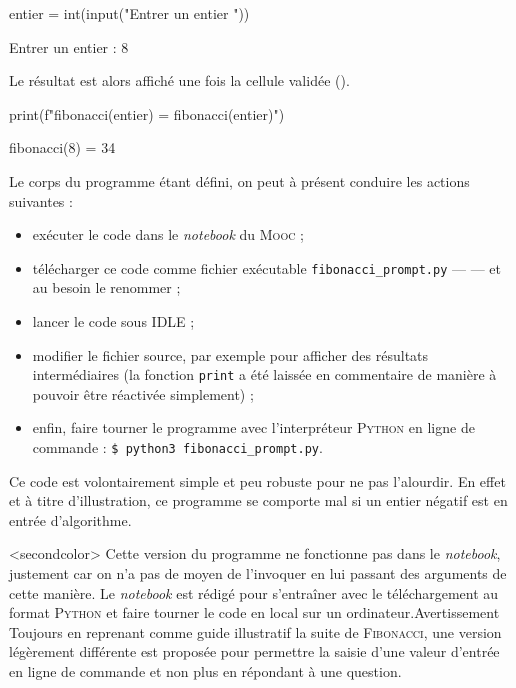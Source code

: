 \begin{nbjupyterin}[before skip=6pt, after skip=4pt]{2}
entier = int(input("Entrer un entier "))
\end{nbjupyterin}
\begin{nbjupyterout}[before skip=2pt, after skip=2pt]{2}
Entrer un entier : 8
\end{nbjupyterout}

Le résultat est alors affiché une fois la cellule validée ().

\begin{nbjupyterin}[before skip=6pt, after skip=4pt]{3}
print(f"fibonacci({entier}) = {fibonacci(entier)}")
\end{nbjupyterin}
\begin{nbjupyterout}[before skip=2pt, after skip=1pt]{3}
fibonacci(8) = 34
\end{nbjupyterout}


\begin{exercise}[title=Suite de {\scshape Fibonacci} I, before skip=8pt, level=basic]
Le corps du programme étant défini, on peut à présent conduire les actions suivantes :
\begin{itemize}
	\item exécuter le code dans le \textit{notebook} du \textsc{Mooc} ;
	\item télécharger ce code comme fichier exécutable \texttt{fibonacci\_prompt.py} ---  --- et au besoin le renommer ;
	\item lancer le code sous IDLE ;
	\item modifier le fichier source, par exemple pour afficher des résultats intermédiaires (la fonction \texttt{print} a été laissée en commentaire de manière à pouvoir être réactivée simplement) ;
	\item enfin, faire tourner le programme avec l'interpréteur \textsc{Python} en ligne de commande :
	\texttt{\$ python3 fibonacci\_prompt.py}.
\end{itemize}

Ce code est volontairement simple et peu robuste pour ne pas l'alourdir. En effet et à titre d'illustration, ce programme se comporte mal si un entier négatif est en entrée d'algorithme.
\end{exercise}



\caution[c]<secondcolor>{%
Cette version du programme ne fonctionne pas dans le \textit{notebook}, justement car on n'a pas de moyen de l'invoquer en lui passant des arguments de cette manière. Le \textit{notebook} est rédigé pour s'entraîner avec le téléchargement au format \textsc{Python} et faire tourner le code en local sur un ordinateur.}{Avertissement}
Toujours en reprenant comme guide illustratif la suite de \textsc{Fibonacci}, une version légèrement différente est proposée pour permettre la saisie d'une valeur d'entrée en ligne de commande et non plus en répondant à une question.

